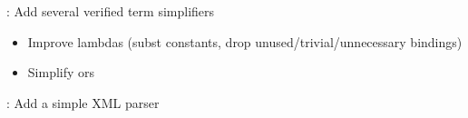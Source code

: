 
\begin{frame}

\implibtitle

: Add several verified term simplifiers
\begin{itemize}
\item Improve lambdas (subst constants, drop unused/trivial/unnecessary bindings)
\item Simplify ors
\end{itemize}

\end{frame}


\begin{frame}

\implibtitle

: Add a simple XML parser

\end{frame}



